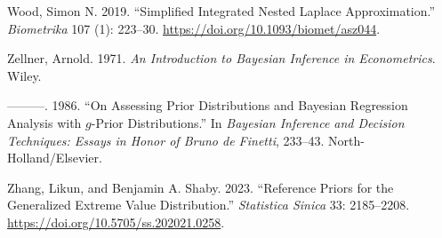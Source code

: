 \documentclass[
  11pt,
  letterpaper,
]{scrbook}
\newlength{\cslhangindent}
\newenvironment{CSLReferences}[2] %
 {\begin{list}{}{%
  \setlength{\itemindent}{0pt}
  \setlength{\leftmargin}{0pt}
  \setlength{\parsep}{0pt}
  \ifodd #1
   \setlength{\leftmargin}{\cslhangindent}
   \setlength{\itemindent}{-1\cslhangindent}
  \fi
  \setlength{\itemsep}{#2\baselineskip}}}
 {\end{list}}
\theoremstyle{plain}
\theoremstyle{definition}
\theoremstyle{definition}
\theoremstyle{plain}
\theoremstyle{plain}
\theoremstyle{definition}
\theoremstyle{remark}
\begin{document}
\begin{CSLReferences}{1}{0}
Wood, Simon N. 2019. {``Simplified Integrated Nested {L}aplace
Approximation.''} \emph{Biometrika} 107 (1): 223--30.
\url{https://doi.org/10.1093/biomet/asz044}.

Zellner, Arnold. 1971. \emph{An Introduction to {B}ayesian Inference in
Econometrics}. Wiley.

---------. 1986. {``On Assessing Prior Distributions and {B}ayesian
Regression Analysis with \(g\)-Prior Distributions.''} In
\emph{{B}ayesian Inference and Decision Techniques: Essays in Honor of
{B}runo de {F}inetti}, 233--43. North-Holland/Elsevier.

Zhang, Likun, and Benjamin A. Shaby. 2023. {``Reference Priors for the
Generalized Extreme Value Distribution.''} \emph{Statistica Sinica} 33:
2185--2208. \url{https://doi.org/10.5705/ss.202021.0258}.

\end{CSLReferences}


\backmatter
\end{document}
